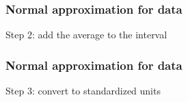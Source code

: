 \documentclass[handout]{beamer}
\begin{document}
   \begin{frame}
   \frametitle{Normal approximation for data}
   \begin{center}
   \end{center}
   Step 2: add the average to the interval
   \end{frame}



   \begin{frame}
   \frametitle{Normal approximation for data}
   \begin{center}
   \end{center}
   Step 3: convert to standardized units
   \end{frame}

\end{document}
